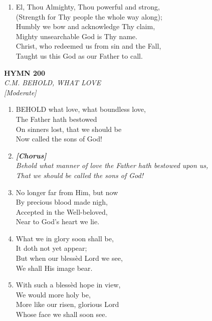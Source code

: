 \begin{enumerate}
    \item El, Thou Almighty, Thou powerful and strong, \\
        (Strength for Thy people the whole way along); \\
        Humbly we bow and acknowledge Thy claim, \\
        Mighty unsearchable God is Thy name. \\
        Christ, who redeemed us from sin and the Fall, \\
        Taught us this God as our Father to call.

\end{enumerate}

\newpage
\begin{center}
    {\Large \textbf{HYMN 200}}
    \\
    \textit{C.M. BEHOLD, WHAT LOVE}
    \\
    \textit{\small [Moderate]}
\end{center}
\vspace{1em}

\begin{enumerate}
    \item BEHOLD what love, what boundless love, \\
        The Father hath bestowed \\
        On sinners lost, that we should be \\
        Now called the sons of God!

    \item[] \vspace{0.4em}
    \textbf{\textit{[Chorus]}} \\
    \textit{Behold what manner of love the Father hath bestowed upon us,} \\
    \textit{That we should be called the sons of God!}
    \vspace{0.4em}

    \item No longer far from Him, but now \\
        By precious blood made nigh, \\
        Accepted in the Well-beloved, \\
        Near to God's heart we lie.

    \item What we in glory soon shall be, \\
        It doth not yet appear; \\
        But when our bless\`ed Lord we see, \\
        We shall His image bear.

    \item With such a bless\`ed hope in view, \\
        We would more holy be, \\
        More like our risen, glorious Lord \\
        Whose face we shall soon see.

\end{enumerate}

